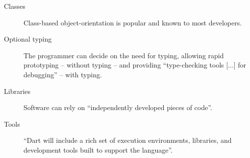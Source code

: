 \begin{description}
\item[Classes] Class-based object-orientation is popular and known to most developers.\cite{TechOver}
\item[Optional typing] The programmer can decide on the need for typing, allowing rapid prototyping -- without typing -- and providing ``type-checking tools [...] for debugging'' -- with typing.\cite{TechOver}
\item[Libraries] Software can rely on ``independently developed pieces of code''.\cite{TechOver}
\item[Tools] ``Dart will include a rich set of execution environments, libraries, and development tools built to support the language''.\cite{TechOver}
\end{description}